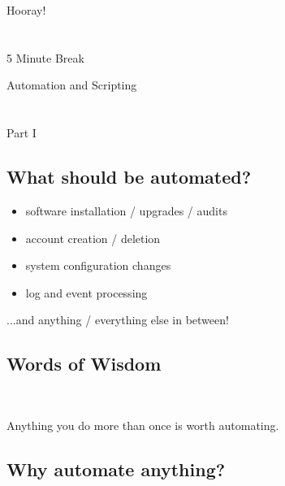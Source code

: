 \documentclass[xga]{xdvislides}
\begin{document}
\newpage
\vspace*{\fill}
\begin{center}
    \Hugesize
        Hooray! \\ [1em]
    \hspace*{5mm}
    \blueline\\
    \hspace*{5mm}\\
        5 Minute Break
\end{center}
\vspace*{\fill}

\newpage
\vspace*{\fill}
\begin{center}
	\Hugesize
		Automation and Scripting \\ [1em]
	\hspace*{5mm}
	\blueline\\
	\hspace*{5mm}\\
		Part I
\end{center}
\vspace*{\fill}

\subsection{What should be automated?}

\begin{itemize}
	\item software installation / upgrades / audits
	\item account creation / deletion
	\item system configuration changes
	\item log and event processing
\end{itemize}
\vspace{.5in}
...and anything / everything else in between!

\subsection{Words of Wisdom}
\\

\newcommand{\gargantuan}{\fontsize{60}{65}\selectfont}
\gargantuan
\begin{center}
Anything you do more than once is worth automating.
\end{center}
\Normalsize



\subsection{Why automate anything?}
\end{document}
